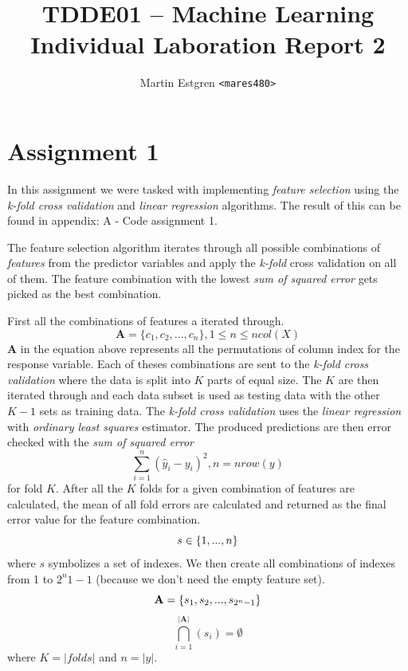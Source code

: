 \documentclass[a4paper,12pt]{article}
\title{TDDE01 -- Machine Learning \\
       Individual Laboration Report 2}
\author{Martin Estgren \texttt{<mares480>}}
\begin{document}
    \maketitle %
\section{Assignment 1}

In this assignment we were tasked with implementing \textit{feature selection} using the \textit{k-fold cross validation} and \textit{linear regression} algorithms. The result of this can be found in appendix: A - Code assignment 1. 

The feature selection algorithm iterates through all possible combinations of \textit{features} from the predictor variables and apply the \textit{k-fold} cross validation on all of them. The feature combination with the lowest \textit{sum of squared error} gets picked as the best combination. 

First all the combinations of features a iterated through.
\begin{equation}
  \mathbf{A} = \{c_1,c_2,...,c_n\}, 1 \le n \le ncol(X)
\end{equation} 
\( \mathbf{A} \) in the equation above represents all the permutations of column index for the response variable. Each of theses combinations are sent to the \textit{k-fold cross validation} where the data is split into  \( \mathit{K} \)  parts of equal size. The  \( \mathit{K} \) are then iterated through and each data subset is used as testing data with the other \( \mathit{K} -1 \) sets as training data. The \textit{k-fold cross validation} uses the \textit{linear regression} with \textit{ordinary least squares} estimator.  The produced predictions are then error checked with the \textit{sum of squared error} 
\begin{equation}
  \sum _{i = 1} ^{n} (\hat{y}_i - y_i)^2, n = nrow(y)
\end{equation} 
for fold \( \mathit{K} \). After all the \( \mathit{K} \) folds for a given combination of features are calculated, the mean of all fold errors are calculated and returned as the final error value for the feature combination.
\begin{equation}
  s \in \{1,...,n\}\\
\end{equation}
where $s$ symbolizes a set of indexes. We then create all combinations of indexes from 1 to $2^n1-1$ (because we don't need the empty feature set).
\begin{equation}
  \mathbf{A} = \{s_1,s_2,...,s_{2^n-1}\}\\
\end{equation}
\begin{equation}
  \bigcap_{i = 1}^{|\mathbf{A}|}{(s_i)} = \emptyset
\end{equation} 
where \( \mathit{K} = |folds|\) and \(n = |y|\). 
\end{document}
